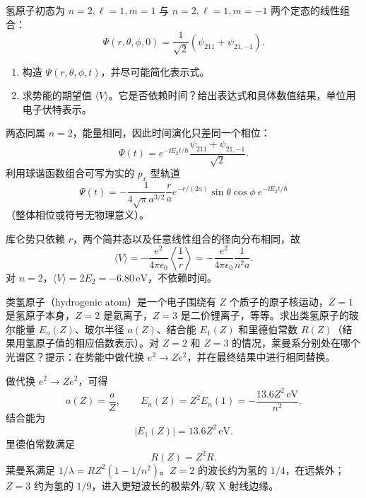 \begin{question}
氢原子初态为 $n=2,\ell=1,m=1$ 与 $n=2,\ell=1,m=-1$ 两个定态的线性组合：
\[
\Psi(r,\theta,\phi,0)=\frac{1}{\sqrt2}\left(\psi_{211}+\psi_{21,-1}\right).
\]
\begin{enumerate}
\item 构造 $\Psi(r,\theta,\phi,t)$，并尽可能简化表示式。
\item 求势能的期望值 $\langle V\rangle$。它是否依赖时间？给出表达式和具体数值结果，单位用电子伏特表示。
\end{enumerate}
\end{question}
\begin{solution}

两态同属 $n=2$，能量相同，因此时间演化只差同一个相位：
\[
\Psi(t)=e^{-\ii E_2t/\hbar}\frac{\psi_{211}+\psi_{21,-1}}{\sqrt2}.
\]
利用球谐函数组合可写为实的 $p_x$ 型轨道
\[
\Psi(t)=-\frac{1}{4\sqrt{\pi}a^{3/2}}\frac{r}{a}e^{-r/(2a)}\sin\theta\cos\phi\ e^{-\ii E_2t/\hbar}
\]
（整体相位或符号无物理意义）。

库仑势只依赖 $r$，两个简并态以及任意线性组合的径向分布相同，故
\[
\langle V\rangle=-\frac{e^2}{4\pi\epsilon_0}\left\langle\frac1r\right\rangle
=-\frac{e^2}{4\pi\epsilon_0}\frac{1}{n^2a}.
\]
对 $n=2$，$\langle V\rangle=2E_2=-6.80\,\mathrm{eV}$，不依赖时间。

\end{solution}

\begin{question}
类氢原子（hydrogenic atom）是一个电子围绕有 $Z$ 个质子的原子核运动，$Z=1$ 是氢原子本身，$Z=2$ 是氦离子，$Z=3$ 是二价锂离子，等等。求出类氢原子的玻尔能量 $E_n(Z)$、玻尔半径 $a(Z)$、结合能 $E_1(Z)$ 和里德伯常数 $R(Z)$（结果用氢原子值的相应倍数表示）。对 $Z=2$ 和 $Z=3$ 的情况，莱曼系分别处在哪个光谱区？提示：在势能中做代换 $e^2\to Ze^2$，并在最终结果中进行相同替换。
\end{question}
\begin{solution}

做代换 $e^2\to Ze^2$，可得
\[
a(Z)=\frac{a}{Z},\qquad E_n(Z)=Z^2E_n(1)=-\frac{13.6Z^2\,\mathrm{eV}}{n^2}.
\]
结合能为
\[
|E_1(Z)|=13.6Z^2\,\mathrm{eV}.
\]
里德伯常数满足
\[
R(Z)=Z^2R.
\]
莱曼系满足 $1/\lambda=RZ^2(1-1/n^2)$。$Z=2$ 的波长约为氢的 $1/4$，在远紫外；$Z=3$ 约为氢的 $1/9$，进入更短波长的极紫外/软 X 射线边缘。

\end{solution}

